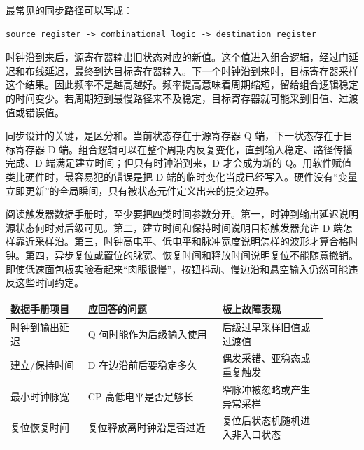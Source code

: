 最常见的同步路径可以写成：

\begin{lstlisting}
source register -> combinational logic -> destination register
\end{lstlisting}
\vspace{1.0em plus 0.35em}

时钟沿到来后，源寄存器输出旧状态对应的新值。这个值进入组合逻辑，经过门延迟和布线延迟，最终到达目标寄存器输入。下一个时钟沿到来时，目标寄存器采样这个结果。因此频率不是越高越好。频率提高意味着周期缩短，留给组合逻辑稳定的时间变少。若周期短到最慢路径来不及稳定，目标寄存器就可能采到旧值、过渡值或错误值。

同步设计的关键，是区分和。当前状态存在于源寄存器 Q 端，下一状态存在于目标寄存器 D 端。组合逻辑可以在整个周期内反复变化，直到输入稳定、路径传播完成、D 端满足建立时间；但只有时钟沿到来，D 才会成为新的 Q。用软件赋值类比硬件时，最容易犯的错误是把 D 端的临时变化当成已经写入。硬件没有“变量立即更新”的全局瞬间，只有被状态元件定义出来的提交边界。

阅读触发器数据手册时，至少要把四类时间参数分开。第一，时钟到输出延迟说明源状态何时对后级可见。第二，建立时间和保持时间说明目标触发器允许 D 端怎样靠近采样沿。第三，时钟高电平、低电平和脉冲宽度说明怎样的波形才算合格时钟。第四，异步复位或置位的脉宽、恢复时间和释放时间说明复位不能随意撤销。即使低速面包板实验看起来“肉眼很慢”，按钮抖动、慢边沿和悬空输入仍然可能违反这些时间约定。

\begin{longtable}{L{0.22\linewidth}L{0.38\linewidth}L{0.3\linewidth}}
\toprule
数据手册项目 & 应回答的问题 & 板上故障表现 \\
\midrule
时钟到输出延迟 & Q 何时能作为后级输入使用 & 后级过早采样旧值或过渡值 \\
建立/保持时间 & D 在边沿前后要稳定多久 & 偶发采错、亚稳态或重复触发 \\
最小时钟脉宽 & CP 高低电平是否足够长 & 窄脉冲被忽略或产生异常采样 \\
复位恢复时间 & 复位释放离时钟沿是否过近 & 复位后状态机随机进入非入口状态 \\
\bottomrule
\end{longtable}
\vspace{1.0em plus 0.35em}

